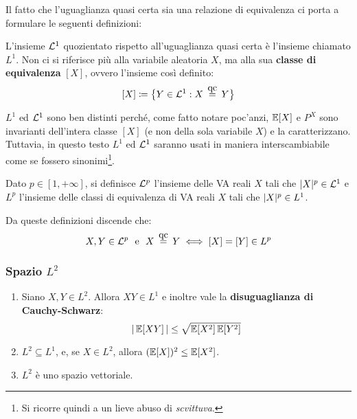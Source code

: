 Il fatto che l'uguaglianza quasi certa sia una relazione di equivalenza ci porta a formulare le seguenti definizioni:

\medskip
\begin{defn}
  L'insieme $\mathcal L^1$ quozientato rispetto all'uguaglianza quasi certa è l'insieme chiamato $L^1$.
  Non ci si riferisce più alla variabile aleatoria $X$, ma alla sua \textbf{classe di equivalenza} $[X]$, ovvero l'insieme così definito:
  $$ [X] \coloneqq \big\{Y \in \Lc^1 : X \aceq Y\big\}$$
\end{defn}
$L^1$ ed $\mathcal L^1$ sono ben distinti perché, come fatto notare poc'anzi, $\mathbb E[X]$ e $P^X$ sono invarianti dell'intera classe $[X]$ (e non della sola variabile $X$) e la caratterizzano.
Tuttavia, in questo testo $L^1$ ed $\mathcal L^1$ saranno usati in maniera interscambiabile come se fossero sinonimi\footnote{Si ricorre quindi a un lieve abuso di \emph{scvittuva}.}.
\medskip
\begin{defn}
  Dato $p \in [1, +\infty]$, si definisce $\mathcal L^p$ l'insieme delle VA reali $X$ tali che $\lvert X\rvert^p \in \mathcal L^1$ e $L^p$ l'insieme delle classi di equivalenza di VA reali $X$ tali che $\lvert X\rvert^p \in L^1$.
\end{defn}
Da queste definizioni discende che:
$$
X,Y \in \Lc^p \ \ \text{e} \ \ X \aceq Y \iff [X] = [Y] \in L^p
$$

\subsubsection{Spazio $L^2$}

\begin{teo}[$L^2$ vs $L^1$ \JPTh{9.3}]
  \Fixvmode
  \begin{enumerate}
    \item Siano $X,Y \in L^2$. Allora $XY \in L^1$ e inoltre vale la \textbf{disuguaglianza di Cauchy-Schwarz}:
    $$ \left\lvert\,\mathbb E[XY]\,\right\lvert \le
    \sqrt{\mathbb E[X^2] \, \mathbb E[Y^2]}$$
    \item $L^2 \subseteq L^1$, e, se $X \in L^2$, allora $(\mathbb E[X])^2 \le \mathbb E[X^2]$.
    \item $L^2$ è uno spazio vettoriale.
  \end{enumerate}
\end{teo}

